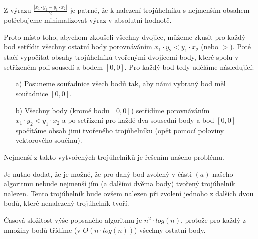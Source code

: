 \documentclass[a4paper, 12pt]{article}
\begin{document}
  Z výrazu $\frac{| x_1 \cdot y_2 - y_1 \cdot x_2 |}{2}$ je patrné, že k nalezení trojúhelníku s nejmenším obsahem potřebujeme minimalizovat výraz v absolutní hodnotě.

  Proto místo toho, abychom zkoušeli všechny dvojice, můžeme zkusit pro každý bod setřídit všechny ostatní body porovnáváním $x_1 \cdot y_2 < y_1 \cdot x_2$ (nebo $>$). Poté stačí vypočítat obsahy trojúhelníků tvořenými dvojicemi body, které spolu v setřízeném poli sousedí a bodem $[0,0]$. Pro každý bod tedy uděláme následující:
  \begin{itemize}
    \item[a)] Posuneme souřadnice všech bodů tak, aby námi vybraný bod měl souřadnice $[0,0]$.
    \item[b)] Všechny body (kromě bodu $[0,0]$) setřídíme porovnáváním $x_1 \cdot y_2 < y_1 \cdot x_2$ a po setřízení pro každé dva sousední body a bod $[0,0]$ spočítáme obsah jimi tvořeného trojúhelníku (opět pomocí poloviny vektorového součinu).
  \end{itemize}

  Nejmenší z takto vytvořených trojúhelníků je řešením našeho problému.

  Je nutno dodat, že je možné, že pro daný bod zvolený v části $(a)$ našeho algoritmu nebude nejmenší jím (a dalšími dvěma body) tvořený trojúhelník nalezen. Tento trojúhelník bude ovšem nalezen při zvolení jednoho z dalších dvou bodů, které nenalezený trojúhelník tvoří.

  Časová složitost výše popsaného algoritmu je $n^2 \cdot log(n)$, protože pro každý z množiny bodů třídíme (v $O(n \cdot log(n))$) všechny ostatní body.
\end{document}
